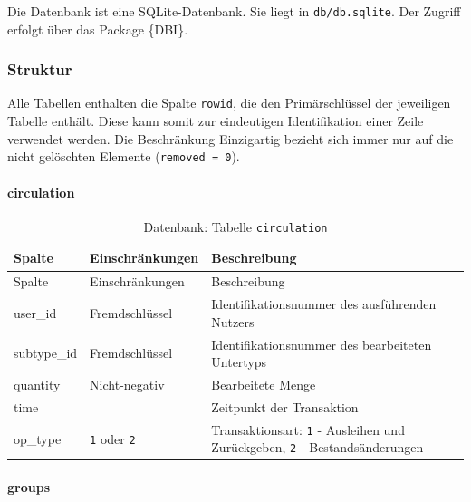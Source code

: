 \documentclass[
]{article}
\begin{document}
Die Datenbank ist eine SQLite-Datenbank. Sie liegt in \texttt{db/db.sqlite}. Der Zugriff erfolgt über das Package \{DBI\}.

\hypertarget{struktur}{%
\subsubsection{Struktur}\label{struktur}}

Alle Tabellen enthalten die Spalte \texttt{rowid}, die den Primärschlüssel der jeweiligen Tabelle enthält. Diese kann somit zur eindeutigen Identifikation einer Zeile verwendet werden. Die Beschränkung Einzigartig bezieht sich immer nur auf die nicht gelöschten Elemente (\texttt{removed\ =\ 0}).

\hypertarget{circulation}{%
\paragraph{circulation}\label{circulation}}

\begin{longtable}[]{@{}
  >{\raggedright\arraybackslash}p{}
  >{\raggedright\arraybackslash}p{}
  >{\raggedright\arraybackslash}p{}@{}}
\caption{\label{tab:circulation} Datenbank: Tabelle \texttt{circulation}}\tabularnewline
\toprule
Spalte & Einschränkungen & Beschreibung \\
\midrule
\endfirsthead
\toprule
Spalte & Einschränkungen & Beschreibung \\
\midrule
\endhead
user\_id & Fremdschlüssel & Identifikationsnummer des ausführenden Nutzers \\
subtype\_id & Fremdschlüssel & Identifikationsnummer des bearbeiteten Untertyps \\
quantity & Nicht-negativ & Bearbeitete Menge \\
time & & Zeitpunkt der Transaktion \\
op\_type & \texttt{1} oder \texttt{2} & Transaktionsart: \texttt{1} - Ausleihen und Zurückgeben, \texttt{2} - Bestandsänderungen \\
\bottomrule
\end{longtable}

\hypertarget{groups}{%
\paragraph{groups}\label{groups}}
\end{document}
